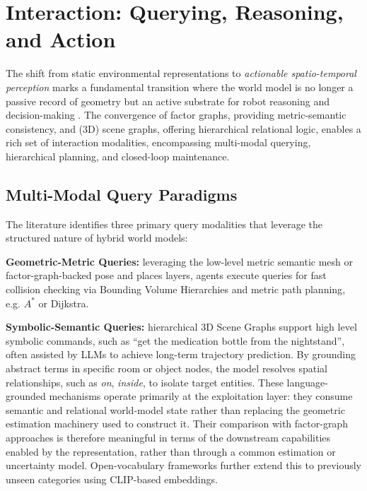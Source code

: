 \section{Interaction: Querying, Reasoning, and Action}\label{sec:querying_reasoning_action}
The shift from static environmental representations to \textit{actionable spatio-temporal perception} marks a fundamental transition where the world model is no longer a passive record of geometry but an active substrate for robot reasoning and decision-making \cite{rosinol_3d_2020} \cite{bavle_slam_2023}.
The convergence of factor graphs, providing metric-semantic consistency, and (3D) scene graphs, offering hierarchical relational logic, enables a rich set of interaction modalities, encompassing multi-modal querying, hierarchical planning, and closed-loop maintenance.

\subsection{Multi-Modal Query Paradigms}\label{sec:querying_reasoning_action_query}
The literature identifies three primary query modalities that leverage the structured nature of hybrid world models:

\noindent\textbf{Geometric-Metric Queries:} leveraging the low-level metric semantic mesh or factor-graph-backed pose and places layers, agents execute queries for fast collision checking via Bounding Volume Hierarchies\cite{rosinol_kimera_2021} and metric path planning\cite{catalano_3d_2025}, e.g. $A^*$ or Dijkstra.

\noindent\textbf{Symbolic-Semantic Queries:} hierarchical 3D Scene Graphs support high level symbolic commands, such as ``get the medication bottle from the nightstand''\cite{catalano_3d_2025}, often assisted by LLMs to achieve long-term trajectory prediction\cite{gorlo_long-term_2024}. 
By grounding abstract terms in specific room or object nodes, the model resolves spatial relationships, such as \textit{on}, \textit{inside}, to isolate target entities.
These language-grounded mechanisms operate primarily at the exploitation layer: they consume semantic and relational world-model state rather than replacing the geometric estimation machinery used to construct it. 
Their comparison with factor-graph approaches is therefore meaningful in terms of the downstream capabilities enabled by the representation, rather than through a common estimation or uncertainty model.
Open-vocabulary frameworks further extend this to previously unseen categories using CLIP-based embeddings. 

